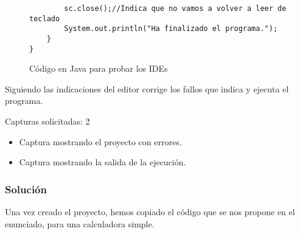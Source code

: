 \begin{figure}[H]
\begin{tcolorbox}[sharp corners, colback=yellow!30, colframe=white!20]
\begin{verbatim}
        sc.close();//Indica que no vamos a volver a leer de teclado
        System.out.println("Ha finalizado el programa.");
    }
}         \end{verbatim}
    \end{tcolorbox}
    \caption{Código en Java para probar los IDEs}
\end{figure}

Siguiendo las indicaciones del editor corrige los fallos que indica y ejecuta el programa.

Capturas solicitadas: 2
\begin{itemize}
    \item Captura mostrando el proyecto con errores.
    \item Captura mostrando la salida de la ejecución.
\end{itemize}

\vspace{2ex}

\subsubsection{Solución}
Una vez creado el proyecto, hemos copiado el código que se nos propone en el enunciado, para una calculadora simple.







\newpage



